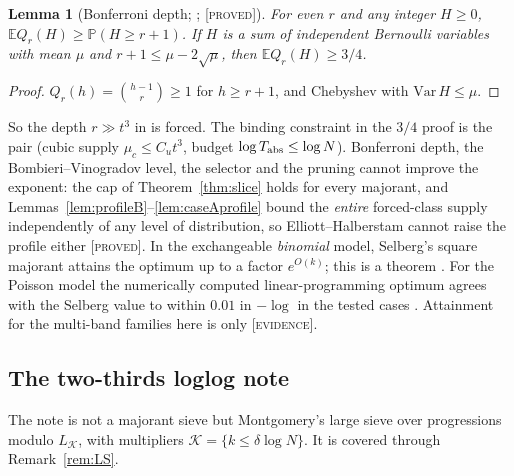 \documentclass[10pt,reqno]{amsart}
\newtheorem{lemma}[theorem]{Lemma}
\theoremstyle{definition}
\theoremstyle{remark}
\newcommand{\E}{\mathbb E}
\newcommand{\Prob}{\mathbb P}
\newcommand{\lab}[1]{\textup{[\textsc{#1}]}}
\begin{document}
\begin{lemma}[Bonferroni depth; {\cite[Lemma~4.2]{ET}}; \lab{proved}]\label{lem:depth}
For even $r$ and any integer $H\geq0$, $\E Q_r(H)\geq\Prob(H\geq r+1)$.  If $H$
is a sum of independent Bernoulli variables with mean $\mu$ and
$r+1\leq\mu-2\sqrt\mu$, then $\E Q_r(H)\geq3/4$.
\end{lemma}
\begin{proof}
$Q_r(h)=\binom{h-1}r\geq1$ for $h\geq r+1$, and Chebyshev with $\mathrm{Var}\,H\leq\mu$.
\end{proof}
So the depth $r\gg t^3$ in \cite{TQ} is forced.  The binding constraint in
the $3/4$ proof is the pair (cubic supply $\mu_c\leq C_ut^3$, budget
$\log T_{\rm abs}\leq\log N$).  Bonferroni depth, the Bombieri--Vinogradov
level, the selector and the pruning cannot improve the exponent: the cap
of Theorem~\ref{thm:slice} holds for every majorant, and
Lemmas~\ref{lem:profileB}--\ref{lem:caseAprofile} bound the \emph{entire}
forced-class supply independently of any level of distribution, so
Elliott--Halberstam cannot raise the profile either \cite[Lemma~4.3 and
remark]{ET} \lab{proved}.  In the exchangeable \emph{binomial} model,
Selberg's square majorant attains the optimum up to a factor $e^{O(k)}$; this
is a theorem \cite[Thm.~1.1, Cor.~1.3]{PYY}.  For the Poisson model the
numerically computed linear-programming optimum agrees with the Selberg
value to within $0.01$ in $-\log$ in the tested cases \cite[\S2.5]{ET}.
Attainment for the multi-band families here is only \lab{evidence}.

\subsection{The two-thirds loglog note}
The note \cite{LL} is not a majorant sieve but Montgomery's large sieve
over progressions modulo $L_{\mathcal K}$, with multipliers
$\mathcal K=\{k\leq\delta\log N\}$.  It is covered through
Remark~\ref{rem:LS}.
\end{document}
